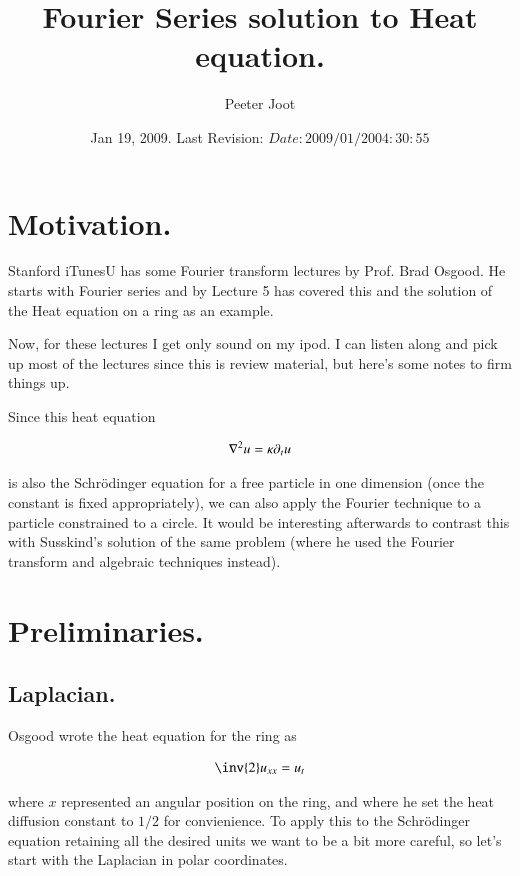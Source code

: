 \documentclass{article}
\title{ Fourier Series solution to Heat equation. }
\author{Peeter Joot}
\date{ Jan 19, 2009.  Last Revision: $Date: 2009/01/20 04:30:55 $ }
\begin{document}
\maketitle{}


\section{ Motivation. }

Stanford iTunesU has some Fourier transform lectures by Prof. Brad Osgood.
He starts with Fourier series and by Lecture 5 has covered this and
the solution of the Heat equation on a ring as an example.

Now, for these lectures I get only sound on my ipod.  I can listen along and
pick up most of the lectures since this is review material, but here's some
notes to firm things up.

Since this heat equation

\begin{align}
\nabla^2 u = \kappa \partial_t u
\end{align}

is also the Schr\"{o}dinger equation for a free particle in one 
dimension (once the 
constant is fixed appropriately), we can also apply the Fourier
technique to a particle
constrained to a circle.  It would be interesting afterwards to 
contrast this with Susskind's solution of the
same problem (where he used the Fourier transform and algebraic techniques
instead).

\section{ Preliminaries. }

\subsection{ Laplacian. }

Osgood wrote the heat equation for the ring as

\begin{align*}
\inv{2} u_{xx} = u_t
\end{align*}

where $x$ represented an angular position on the ring, and where
he set the heat diffusion constant to $1/2$ for convienience.
To apply this to the Schr\"{o}dinger equation retaining all the desired
units we want to be a bit more careful, so let's start with the Laplacian
in polar coordinates.
\end{document}
